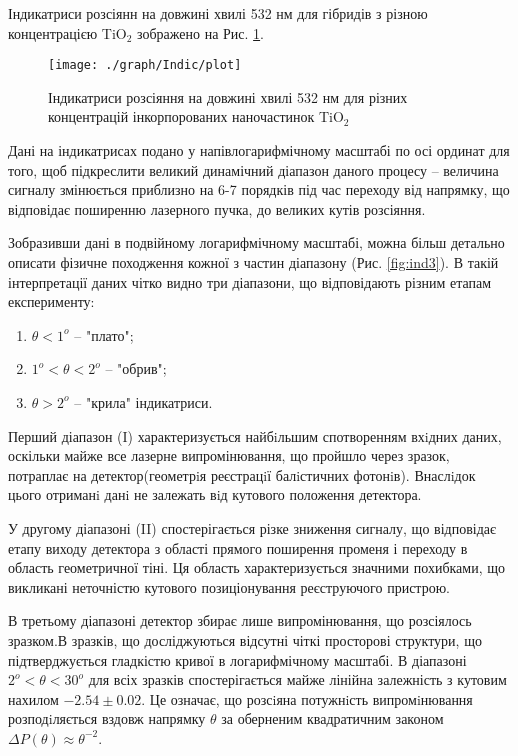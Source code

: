 Індикатриси розсіянн на довжині хвилі 532 нм для гібридів з різною концентрацією TiO$_2$ зображено на Рис. \ref{fig:ind2}.

\begin{figure}
\centering
\texttt{[image: ./graph/Indic/plot]}
\caption{Індикатриси розсіяння на довжині хвилі 532 нм для різних концентрацій інкорпорованих наночастинок TiO$_2$}\label{fig:ind2}
\end{figure}

Дані на індикатрисах подано у напівлогарифмічному масштабі по осі ординат для того, щоб
підкреслити великий динамічний діапазон даного процесу -- величина сигналу
змінюється приблизно на 6-7 порядків під час переходу від напрямку, що відповідає
поширенню лазерного пучка, до великих кутів розсіяння.

Зобразивши дані в подвійному логарифмічному масштабі, можна більш детально описати фізичне походження кожної з частин діапазону (Рис. \ref{fig:ind3}). В такій інтерпретації даних чітко видно три діапазони, що відповідають різним етапам експерименту:
\begin{enumerate}[I]
\item $\theta<1^o$ -- "плато"; 
\item $1^o<\theta<2^o$ -- "обрив";
\item $\theta>2^o$ -- "крила" індикатриси.
\end{enumerate}


Перший діапазон (I) характеризується найбiльшим
спотворенням вхiдних даних, оскільки майже все лазерне випромінювання, що пройшло через зразок, потраплає на детектор(геометрiя реєстрацiї балiстичних фотонiв). Внаслiдок цього отриманi данi не залежать вiд кутового положення детектора.

У другому діапазоні (II) спостерігається різке зниження сигналу, що відповідає етапу виходу детектора з області прямого поширення променя і переходу в область геометричної тіні. Ця область характеризується значними похибками, що викликані неточністю кутового позиціонування реєструючого пристрою. 

В третьому діапазоні детектор збирає лише випромінювання, що розсіялось зразком.В зразків, що досліджуються відсутні чіткі просторові структури, що підтверджується гладкістю кривої в логарифмічному масштабі. В діапазоні $2^o<\theta<30^o$ для всіх зразків спостерігається майже лінійна залежність з кутовим нахилом $-2.54 \pm 0.02$. Це означає, що розсiяна
потужнiсть випромiнювання розподiляється вздовж напрямку $\theta$ за оберненим
квадратичним законом $\Delta P(\theta) \approx \theta^{-2}$.

